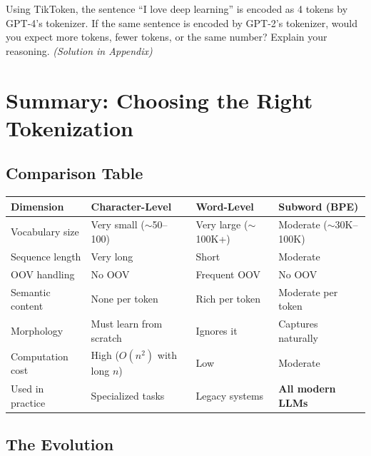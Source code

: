 \documentclass[11pt,a4paper]{article}
\begin{document}
\begin{tcolorbox}[questionbox={Self-Check Q6}]
Using TikToken, the sentence ``I love deep learning'' is encoded as 4 tokens by GPT-4's tokenizer. If the same sentence is encoded by GPT-2's tokenizer, would you expect more tokens, fewer tokens, or the same number? Explain your reasoning. \textit{(Solution in Appendix)}
\end{tcolorbox}

\section{Summary: Choosing the Right Tokenization}

\subsection{Comparison Table}

\begin{center}
\renewcommand{\arraystretch}{1.4}
\begin{tabular}{@{}p{3.2cm}p{3.5cm}p{3.5cm}p{3.5cm}@{}}
\toprule
\textbf{Dimension} & \textbf{Character-Level} & \textbf{Word-Level} & \textbf{Subword (BPE)} \\
\midrule
Vocabulary size & Very small ($\sim$50--100) & Very large ($\sim$100K+) & Moderate ($\sim$30K--100K) \\
Sequence length & Very long & Short & Moderate \\
OOV handling & No OOV & Frequent OOV & No OOV \\
Semantic content & None per token & Rich per token & Moderate per token \\
Morphology & Must learn from scratch & Ignores it & Captures naturally \\
Computation cost & High ($O(n^2)$ with long $n$) & Low & Moderate \\
Used in practice & Specialized tasks & Legacy systems & \textbf{All modern LLMs} \\
\bottomrule
\end{tabular}
\end{center}

\subsection{The Evolution}
\end{document}
